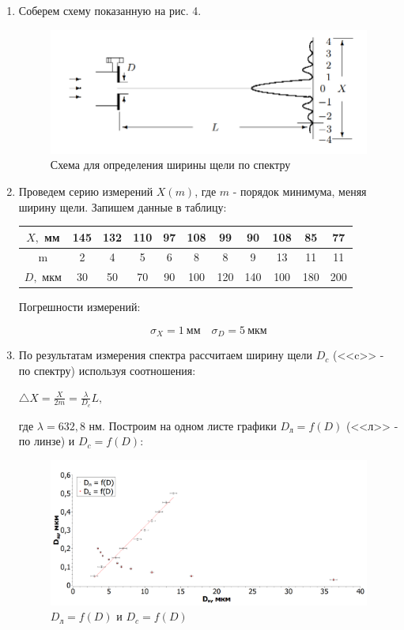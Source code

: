 \documentclass[a4paper, 12pt]{article}%
\begin{document}
\begin{enumerate}

\item Соберем схему показанную на рис. 4.

\begin{figure}[h!]
	\includegraphics[width = 1.0\linewidth]{images/6.png}
	\caption{Схема для определения ширины щели по спектру}
\end{figure}

\item Проведем серию измерений $X(m)$, где $m$ - порядок минимума, меняя ширину щели. Запишем данные в таблицу:

\begin{center}
\begin{tabular}{|c|c|c|c|c|c|c|c|c|c|c|}
\hline 
$X,$ мм & 145 & 132 & 110 & 97 & 108 & 99 & 90 & 108 & 85 & 77 \\ 
\hline 
m & 2 & 4 & 5 & 6 & 8 & 8 & 9 & 13 & 11 & 11 \\ 
\hline 
$D,$ мкм & 30 & 50 & 70 & 90 & 100 & 120 & 140 & 100 & 180 & 200 \\ 
\hline 
\end{tabular} 
\end{center}

Погрешности измерений:

\[\sigma_X = 1 \: \text{мм} \quad \sigma_D = 5 \: \text{мкм} \]

\item По результатам измерения спектра рассчитаем ширину щели $D_c$ (<<c>> - по спектру) используя соотношения:

$\bigtriangleup X = \frac{X}{2m} = \frac{\lambda}{D_c} L,$

где $\lambda = 632,8$ нм. Построим на одном листе графики $D_{\text{л}} = f(D)$ (<<л>> - по линзе) и $D_c = f(D)$:

\begin{figure}[h!]
	\includegraphics[width = 1.0\linewidth]{images/graph_3.png}
	\caption{$D_{\text{л}} = f(D)$ и $D_c = f(D)$}
\end{figure}


\end{enumerate}
\end{document}
